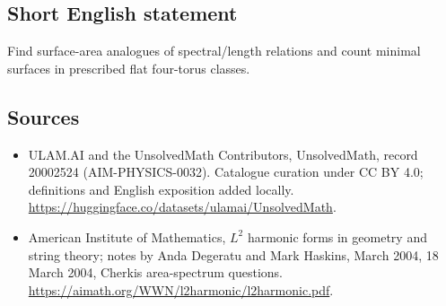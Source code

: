 \documentclass[11pt]{article}
\begin{document}
\subsection{Short English statement}
Find surface-area analogues of spectral/length relations and count minimal surfaces in prescribed flat four-torus classes.
\subsection{Sources}
\begin{itemize}
\item[\hypertarget{source:20002524:1}{S1}] ULAM.AI and the UnsolvedMath Contributors, UnsolvedMath, record 20002524 (AIM-PHYSICS-0032). Catalogue curation under CC BY 4.0; definitions and English exposition added locally.
\url{https://huggingface.co/datasets/ulamai/UnsolvedMath}.
\item[\hypertarget{source:20002524:2}{S2}] American Institute of Mathematics, $L^2$ harmonic forms in geometry and string theory; notes by Anda Degeratu and Mark Haskins, March 2004, 18 March 2004, Cherkis area-spectrum questions.
\url{https://aimath.org/WWN/l2harmonic/l2harmonic.pdf}.
\end{itemize}
\label{end:20002524}
\end{document}
